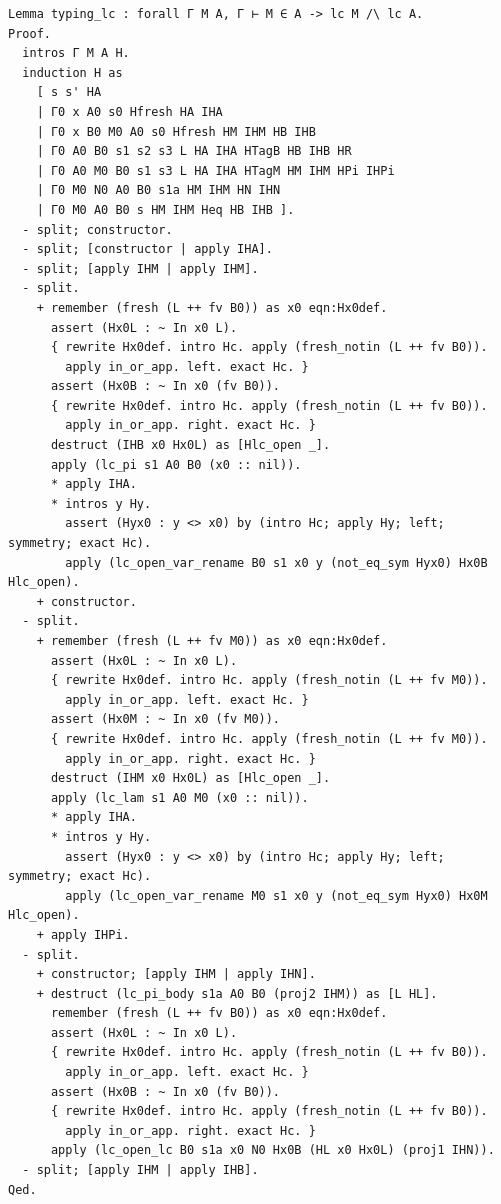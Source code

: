 \begin{latin}
\begin{verbatim}
Lemma typing_lc : forall Γ M A, Γ ⊢ M ∈ A -> lc M /\ lc A.
Proof.
  intros Γ M A H.
  induction H as
    [ s s' HA
    | Γ0 x A0 s0 Hfresh HA IHA
    | Γ0 x B0 M0 A0 s0 Hfresh HM IHM HB IHB
    | Γ0 A0 B0 s1 s2 s3 L HA IHA HTagB HB IHB HR
    | Γ0 A0 M0 B0 s1 s3 L HA IHA HTagM HM IHM HPi IHPi
    | Γ0 M0 N0 A0 B0 s1a HM IHM HN IHN
    | Γ0 M0 A0 B0 s HM IHM Heq HB IHB ].
  - split; constructor.
  - split; [constructor | apply IHA].
  - split; [apply IHM | apply IHM].
  - split.
    + remember (fresh (L ++ fv B0)) as x0 eqn:Hx0def.
      assert (Hx0L : ~ In x0 L).
      { rewrite Hx0def. intro Hc. apply (fresh_notin (L ++ fv B0)).
        apply in_or_app. left. exact Hc. }
      assert (Hx0B : ~ In x0 (fv B0)).
      { rewrite Hx0def. intro Hc. apply (fresh_notin (L ++ fv B0)).
        apply in_or_app. right. exact Hc. }
      destruct (IHB x0 Hx0L) as [Hlc_open _].
      apply (lc_pi s1 A0 B0 (x0 :: nil)).
      * apply IHA.
      * intros y Hy.
        assert (Hyx0 : y <> x0) by (intro Hc; apply Hy; left; symmetry; exact Hc).
        apply (lc_open_var_rename B0 s1 x0 y (not_eq_sym Hyx0) Hx0B Hlc_open).
    + constructor.
  - split.
    + remember (fresh (L ++ fv M0)) as x0 eqn:Hx0def.
      assert (Hx0L : ~ In x0 L).
      { rewrite Hx0def. intro Hc. apply (fresh_notin (L ++ fv M0)).
        apply in_or_app. left. exact Hc. }
      assert (Hx0M : ~ In x0 (fv M0)).
      { rewrite Hx0def. intro Hc. apply (fresh_notin (L ++ fv M0)).
        apply in_or_app. right. exact Hc. }
      destruct (IHM x0 Hx0L) as [Hlc_open _].
      apply (lc_lam s1 A0 M0 (x0 :: nil)).
      * apply IHA.
      * intros y Hy.
        assert (Hyx0 : y <> x0) by (intro Hc; apply Hy; left; symmetry; exact Hc).
        apply (lc_open_var_rename M0 s1 x0 y (not_eq_sym Hyx0) Hx0M Hlc_open).
    + apply IHPi.
  - split.
    + constructor; [apply IHM | apply IHN].
    + destruct (lc_pi_body s1a A0 B0 (proj2 IHM)) as [L HL].
      remember (fresh (L ++ fv B0)) as x0 eqn:Hx0def.
      assert (Hx0L : ~ In x0 L).
      { rewrite Hx0def. intro Hc. apply (fresh_notin (L ++ fv B0)).
        apply in_or_app. left. exact Hc. }
      assert (Hx0B : ~ In x0 (fv B0)).
      { rewrite Hx0def. intro Hc. apply (fresh_notin (L ++ fv B0)).
        apply in_or_app. right. exact Hc. }
      apply (lc_open_lc B0 s1a x0 N0 Hx0B (HL x0 Hx0L) (proj1 IHN)).
  - split; [apply IHM | apply IHB].
Qed.


\end{verbatim}
\end{latin}
